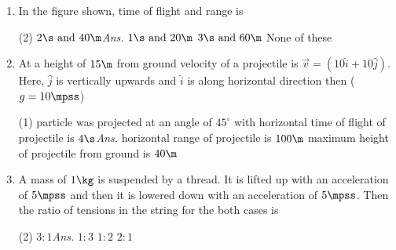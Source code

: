 \documentclass{article}
\newcommand{\ans}{\textcolor{red!95}{\textit{\quad Ans.}}}
\begin{document}
\begin{enumerate}
\begin{center}
\begin{tikzpicture}
        \end{tikzpicture}
    \end{center}
    \begin{tasks}(2)
            \task $29 m/s$
            \task $5 m/s$
            \task $6 m/s$ \ans
            \task $12 m/s$
    \end{tasks}


\item In the figure shown, time of flight and range is
	\begin{center}
	\end{center}
	\begin{tasks}(2)
		\task $2\s \text{ and } 40\m$\ans
		\task $1\s \text{ and } 20\m$
		\task $3\s \text{ and } 60\m$
		\task None of these
	\end{tasks}	

            
            
\item At a height of $15 \m$ from ground velocity of a projectile is $\vec{v} = (10 \hat{i} + 10\hat{j})$. Here, $\hat{j}$ is vertically upwards and $\hat{i}$ is along horizontal direction then ($g = 10 \mpss$)
\begin{tasks}(1)
	\task particle was projected at an angle of $45^\circ$ with horizontal
	\task time of flight of projectile is $4 \s$\ans
	\task horizontal range of projectile is $100 \m$
	\task maximum height of projectile from ground is $40 \m$
\end{tasks}

\item A mass of $1\kg$ is suspended by a thread. It is lifted up with an acceleration of $5\mpss$ and then it is lowered down with an acceleration of $5\mpss$. Then the ratio of tensions in the string for the both cases is
\begin{center}
\end{center}
\begin{tasks}(2)
	\task $3:1$\ans
	\task $1:3$
	\task $1:2$
	\task $2:1$
\end{tasks}


\end{enumerate}
\end{document}
